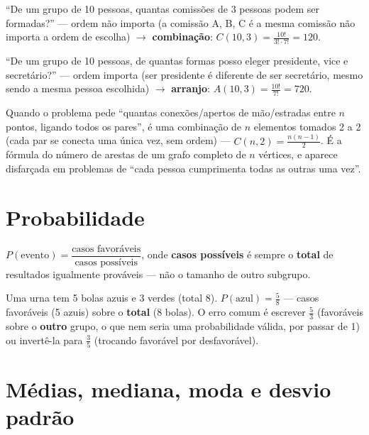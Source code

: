 \begin{exemplo}
“De um grupo de 10 pessoas, quantas comissões de 3 pessoas podem ser
formadas?” --- ordem não importa (a comissão {A, B, C} é a mesma comissão
não importa a ordem de escolha) $\to$ \textbf{combinação}: $C(10,3) =
\frac{10!}{3! \cdot 7!} = 120$.

“De um grupo de 10 pessoas, de quantas formas posso eleger presidente,
vice e secretário?” --- ordem importa (ser presidente é diferente de ser
secretário, mesmo sendo a mesma pessoa escolhida) $\to$ \textbf{arranjo}:
$A(10,3) = \frac{10!}{7!} = 720$.
\end{exemplo}

\begin{regrapratica}
Quando o problema pede “quantas conexões/apertos de mão/estradas entre
$n$ pontos, ligando todos os pares”, é uma combinação de $n$ elementos
tomados 2 a 2 (cada par se conecta uma única vez, sem ordem) ---
$C(n,2) = \frac{n(n-1)}{2}$. É a fórmula do número de arestas de um grafo
completo de $n$ vértices, e aparece disfarçada em problemas de “cada
pessoa cumprimenta todas as outras uma vez”.
\end{regrapratica}

\section{Probabilidade}

\begin{conceito}
$P(\text{evento}) = \dfrac{\text{casos favoráveis}}{\text{casos
possíveis}}$, onde \textbf{casos possíveis} é sempre o \textbf{total} de
resultados igualmente prováveis --- não o tamanho de outro subgrupo.
\end{conceito}

\begin{exemplo}
Uma urna tem 5 bolas azuis e 3 verdes (total 8). $P(\text{azul}) =
\frac{5}{8}$ --- casos favoráveis (5 azuis) sobre o \textbf{total} (8
bolas). O erro comum é escrever $\frac{5}{3}$ (favoráveis sobre o
\textbf{outro} grupo, o que nem seria uma probabilidade válida, por passar
de 1) ou invertê-la para $\frac{3}{5}$ (trocando favorável por
desfavorável).
\end{exemplo}

\section{Médias, mediana, moda e desvio padrão}

